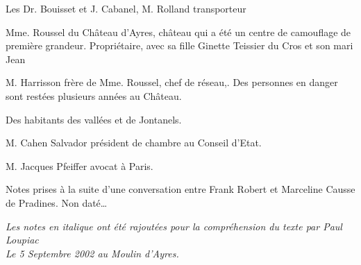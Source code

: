 Les Dr. Bouisset et J. Cabanel, M. Rolland transporteur

Mme. Roussel du Château d’Ayres, château qui a été un centre de camouflage de première
grandeur. Propriétaire, avec sa fille Ginette Teissier du Cros et son mari Jean

M. Harrisson frère de Mme. Roussel, chef de réseau,. Des personnes en danger sont restées
plusieurs années au Château.

Des habitants des vallées et de Jontanels.

M. Cahen Salvador président de chambre au Conseil d’Etat.

M. Jacques Pfeiffer avocat à Paris.

\medskip

Notes prises à la suite d’une conversation entre Frank Robert et Marceline Causse de
Pradines. Non daté…

\medskip

\textit{Les notes en italique ont été rajoutées pour la compréhension du texte par Paul Loupiac\\
Le 5 Septembre 2002 au Moulin d’Ayres.}


